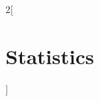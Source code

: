 \documentclass[../../../main.tex]{subfiles}
\begin{document}
\begin{multicols}{2}[\section{Statistics}]
\end{multicols}
\end{document}
